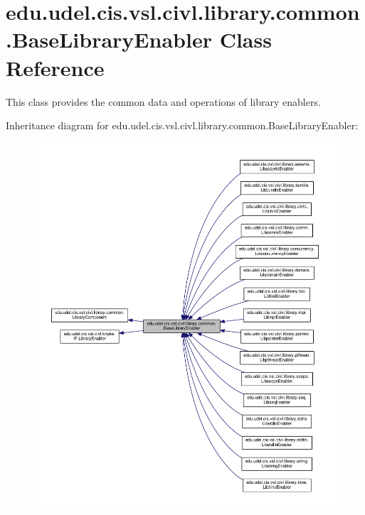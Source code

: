 \hypertarget{classedu_1_1udel_1_1cis_1_1vsl_1_1civl_1_1library_1_1common_1_1BaseLibraryEnabler}{}\section{edu.\+udel.\+cis.\+vsl.\+civl.\+library.\+common.\+Base\+Library\+Enabler Class Reference}
\label{classedu_1_1udel_1_1cis_1_1vsl_1_1civl_1_1library_1_1common_1_1BaseLibraryEnabler}


This class provides the common data and operations of library enablers.  




Inheritance diagram for edu.\+udel.\+cis.\+vsl.\+civl.\+library.\+common.\+Base\+Library\+Enabler\+:
\nopagebreak
\begin{figure}[H]
\begin{center}
\leavevmode
\includegraphics[width=350pt]{classedu_1_1udel_1_1cis_1_1vsl_1_1civl_1_1library_1_1common_1_1BaseLibraryEnabler__inherit__graph}
\end{center}
\end{figure}



